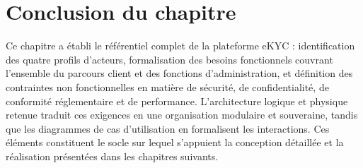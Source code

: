 \section*{Conclusion du chapitre}

Ce chapitre a établi le référentiel complet de la plateforme eKYC : identification des quatre profils d'acteurs, formalisation des besoins fonctionnels couvrant l'ensemble du parcours client et des fonctions d'administration, et définition des contraintes non fonctionnelles en matière de sécurité, de confidentialité, de conformité réglementaire et de performance. L'architecture logique et physique retenue traduit ces exigences en une organisation modulaire et souveraine, tandis que les diagrammes de cas d'utilisation en formalisent les interactions. Ces éléments constituent le socle sur lequel s'appuient la conception détaillée et la réalisation présentées dans les chapitres suivants.
